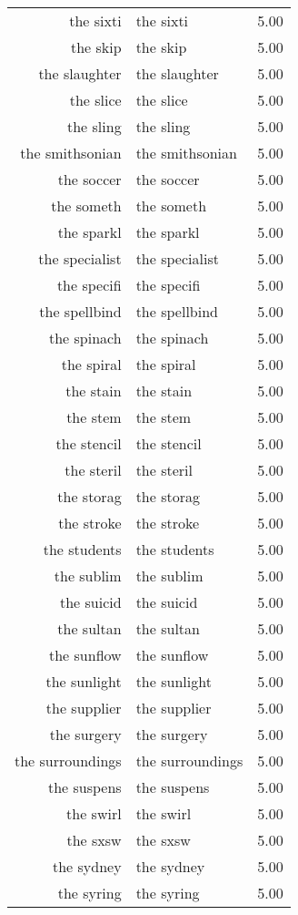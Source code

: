 \begin{table}[ht]
\begin{tabular}{rlr}
  the sixti & the sixti & 5.00 \\ 
  the skip & the skip & 5.00 \\ 
  the slaughter & the slaughter & 5.00 \\ 
  the slice & the slice & 5.00 \\ 
  the sling & the sling & 5.00 \\ 
  the smithsonian & the smithsonian & 5.00 \\ 
  the soccer & the soccer & 5.00 \\ 
  the someth & the someth & 5.00 \\ 
  the sparkl & the sparkl & 5.00 \\ 
  the specialist & the specialist & 5.00 \\ 
  the specifi & the specifi & 5.00 \\ 
  the spellbind & the spellbind & 5.00 \\ 
  the spinach & the spinach & 5.00 \\ 
  the spiral & the spiral & 5.00 \\ 
  the stain & the stain & 5.00 \\ 
  the stem & the stem & 5.00 \\ 
  the stencil & the stencil & 5.00 \\ 
  the steril & the steril & 5.00 \\ 
  the storag & the storag & 5.00 \\ 
  the stroke & the stroke & 5.00 \\ 
  the students & the students & 5.00 \\ 
  the sublim & the sublim & 5.00 \\ 
  the suicid & the suicid & 5.00 \\ 
  the sultan & the sultan & 5.00 \\ 
  the sunflow & the sunflow & 5.00 \\ 
  the sunlight & the sunlight & 5.00 \\ 
  the supplier & the supplier & 5.00 \\ 
  the surgery & the surgery & 5.00 \\ 
  the surroundings & the surroundings & 5.00 \\ 
  the suspens & the suspens & 5.00 \\ 
  the swirl & the swirl & 5.00 \\ 
  the sxsw & the sxsw & 5.00 \\ 
  the sydney & the sydney & 5.00 \\ 
  the syring & the syring & 5.00 \\ 

\end{tabular}
\end{table}

